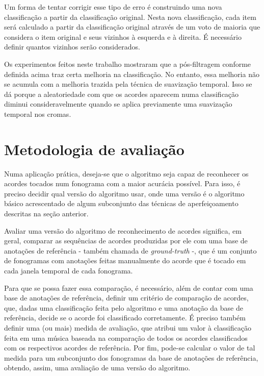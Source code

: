         Um forma de tentar corrigir esse tipo de erro é construindo uma nova classificação a partir da classificação original. Nesta nova classificação, cada item será calculado a partir da classificação original através de um voto de maioria que considera o item original e seus vizinhos à esquerda e à direita. É necessário definir quantos vizinhos serão considerados.
        
        Os experimentos feitos neste trabalho mostraram que a pós-filtragem conforme definida acima traz certa melhoria na classificação. No entanto, essa melhoria não se acumula com a melhoria trazida pela técnica de suavização temporal. Isso se dá porque a aleatoriedade com que os acordes aparecem numa classificação diminui consideravelmente quando se aplica previamente uma suavização temporal nos cromas.
        
        
\section{Metodologia de avaliação}
    Numa aplicação prática, deseja-se que o algoritmo seja capaz de reconhecer os acordes tocados num fonograma com a maior acurácia possível. Para isso, é preciso decidir qual versão do algoritmo usar, onde uma versão é o algoritmo básico acrescentado de algum subconjunto das técnicas de aperfeiçoamento descritas na seção anterior.
    
    Avaliar uma versão do algoritmo de reconhecimento de acordes significa, em geral, comparar as sequências de acordes produzidas por ele com uma base de anotações de referência - também chamada de \textit{ground-truth} -, que é um conjunto de fonogramas com anotações feitas manualmente do acorde que é tocado em cada janela temporal de cada fonograma.
    
    Para que se possa fazer essa comparação, é necessário, além de contar com uma base de anotações de referência, definir um critério de comparação de acordes, que, dadas uma classificação feita pelo algoritmo e uma anotação da base de referência, decide se o acorde foi classificado corretamente. É preciso também definir uma (ou mais) medida de avaliação, que atribui um valor à classificação feita em uma música baseada na comparação de todos os acordes classificados com os respectivos acordes de referência. Por fim, pode-se calcular o valor de tal medida para um subconjunto dos fonogramas da base de anotações de referência, obtendo, assim, uma avaliação de uma versão do algoritmo.

